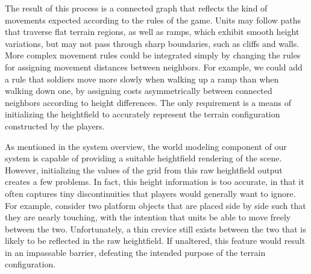 \documentclass{thesis}
\begin{document}
The result of this process is a connected graph that reflects the kind of movements expected according to the rules of the game. Units may follow paths that traverse flat terrain regions, as well as ramps, which exhibit smooth height variations, but may not pass through sharp boundaries, such as cliffs and walls. More complex movement rules could be integrated simply by changing the rules for assigning movement distances between neighbors. For example, we could add a rule that soldiers move more slowly when walking up a ramp than when walking down one, by assigning costs asymmetrically between connected neighbors according to height differences. The only requirement is a means of initializing the heightfield to accurately represent the terrain configuration constructed by the players.

As mentioned in the system overview, the world modeling component of our system is capable of providing a suitable heightfield rendering of the scene. However, initializing the values of the grid from this raw heightfield output creates a few problems. In fact, this height information is too accurate, in that it often captures tiny discontinuities that players would generally want to ignore. For example, consider two platform objects that are placed side by side such that they are nearly touching, with the intention that units be able to move freely between the two. Unfortunately, a thin crevice still exists between the two that is likely to be reflected in the raw heightfield. If unaltered, this feature would result in an impassable barrier, defeating the intended purpose of the terrain configuration.
\end{document}

